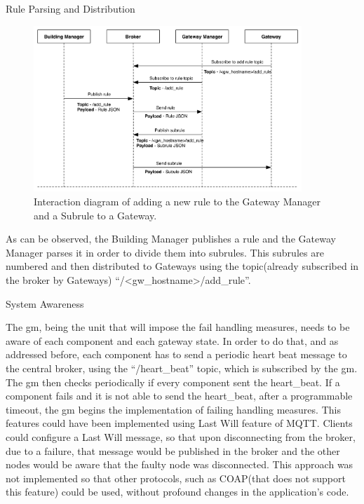\begin{Paragraph}{Rule Parsing and Distribution}
\begin{figure}[H]
	\centering
	\includegraphics[width=0.9\textwidth]{figures/addrule.png}
	\caption{Interaction diagram of adding a new rule to the Gateway Manager and a Subrule to a Gateway.}
	\label{fig:addrule}
\end{figure}

As can be observed, the Building Manager publishes a rule and the Gateway Manager parses it in order to divide them into subrules. This subrules are numbered and then distributed to Gateways using the topic(already subscribed in the broker by Gateways) ``/<gw\_hostname>/add\_rule''.

\end{Paragraph}

\begin{Paragraph}{System Awareness}

The \ac{gm}, being the unit that will impose the fail handling measures, needs to be aware of each component and each gateway state. In order to do that, and as addressed before, each component has to send a periodic heart beat message to the central broker, using the ``/heart\_beat'' topic, which is subscribed by the \ac{gm}. The \ac{gm} then checks periodically if every component sent the heart\_beat. If a component fails and it is not able to send the heart\_beat, after a programmable timeout, the \ac{gm} begins the implementation of failing handling measures. This features could have been implemented using Last Will feature of MQTT. Clients could configure a Last Will message, so that upon disconnecting from the broker, due to a failure, that message would be published in the broker and the other nodes would be aware that the faulty node was disconnected. This approach was not implemented so that other protocols, such as COAP(that does not support this feature) could be used, without profound changes in the application's code.

\end{Paragraph}

